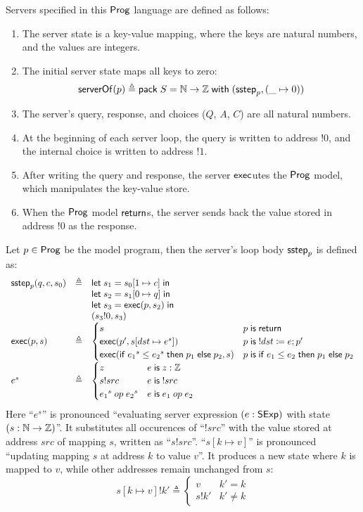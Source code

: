 Servers specified in this $\mathsf{Prog}$ language are defined as follows:
\begin{enumerate}
\item The server state is a key-value mapping, where the keys are natural
  numbers, and the values are integers.
\item The initial server state maps all keys to zero:
  \[\mathsf{serverOf}(p)\triangleq\mathsf{pack}\;S=\mathbb N\to\mathbb Z\;\mathsf{with}\;(\mathsf{sstep}_p,(\_\mapsto0))\]
\item The server's query, response, and choices ($Q$, $A$, $C$) are all
  natural numbers.
\item At the beginning of each server loop, the query is written to address
  $!0$, and the internal choice is written to address $!1$.
\item After writing the query and response, the server $\mathsf{exec}$utes the $\mathsf{Prog}$
  model, which manipulates the key-value store.
\item When the $\mathsf{Prog}$ model $\mathsf{return}$s, the server sends back the value stored
  in address $!0$ as the response.
\end{enumerate}
Let $p\in\mathsf{Prog}$ be the model program, then the server's loop body $\mathsf{sstep}_p$ is
defined as:
\[\begin{array}{lrl}
\mathsf{sstep}_p(q,c,s_0)&\triangleq&\mathsf{let}\; s_1=s_0[1\mapsto c]\;\mathsf{in}\;\\
&&\mathsf{let}\; s_2=s_1[0\mapsto q]\;\mathsf{in}\;\\
&&\mathsf{let}\; s_3=\mathsf{exec}(p,s_2)\;\mathsf{in}\;\\
&&(s_3!0,s_3)\\
\mathsf{exec}(p,s)&\triangleq&
\begin{cases}
  s&p\;\mathsf{is}\;\mathsf{return}\\
  \mathsf{exec}(p',s[dst\mapsto e^s])&p\;\mathsf{is}\; !dst\coloneqq e;p'\\
  \mathsf{exec}(\mathsf{if}\; {e_1}^s\le{e_2}^s\;\mathsf{then}\; p_1\;\mathsf{else}\; p_2,s)&p\;\mathsf{is}\;\mathsf{if}\; e_1\le e_2\;\mathsf{then}\; p_1\;\mathsf{else}\; p_2
\end{cases}\\
e^s&\triangleq&
\begin{cases}
  z&e\;\mathsf{is}\; z:\mathbb Z\\
  s!src&e\;\mathsf{is}\; !src\\
  {e_1}^s\;op\;{e_2}^s&e\;\mathsf{is}\; e_1\;op\;e_2
\end{cases}
\end{array}\]
Here ``$e^s$'' is pronounced ``evaluating server expression $(e:\mathsf{SExp})$ with
state $(s:\mathbb N\to\mathbb Z)$''.  It substitutes all occurences of ``$!src$'' with the
value stored at address $src$ of mapping $s$, written as ``$s!src$''.
``$s[k\mapsto v]$'' is pronounced ``updating mapping $s$ at address $k$ to value
$v$''.  It produces a new state where $k$ is mapped to $v$, while other
addresses remain unchanged from $s$:
\[s[k\mapsto v]!k'\triangleq\begin{cases}v&k'=k\\
s!k'&k'\neq k\end{cases}\]

